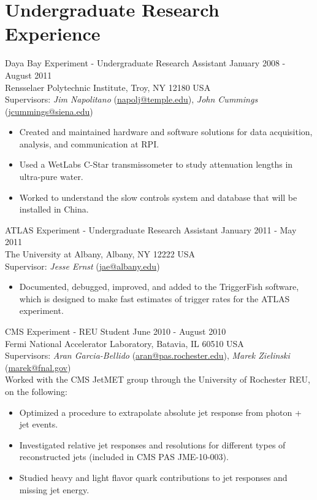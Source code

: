 \section{Undergraduate Research Experience}
Daya Bay Experiment - Undergraduate Research Assistant \hfill January 2008 - August 2011\\
Rensselaer Polytechnic Institute, Troy, NY 12180 USA\\
Supervisors: {\sl Jim Napolitano} (\href{mailto:napolj@temple.edu}{napolj@temple.edu}), {\sl John Cummings} (\href{mailto:jcummings@siena.edu}{jcummings@siena.edu})
\begin{itemize}[leftmargin=12pt]
\item Created and maintained hardware and software solutions for data acquisition, analysis, and communication at RPI.
\item Used a WetLabs C-Star transmissometer to study attenuation lengths in ultra-pure water.
\item Worked to understand the slow controls system and database that will be installed in China.
\end{itemize}
ATLAS Experiment - Undergraduate Research Assistant \hfill January 2011 - May 2011\\
The University at Albany, Albany, NY 12222 USA\\
Supervisor: {\sl Jesse Ernst} (\href{mailto:jae@albany.edu}{jae@albany.edu})
\begin{itemize}[leftmargin=12pt]
\item Documented, debugged, improved, and added to the TriggerFish software, which is designed to make fast estimates of trigger rates for the ATLAS experiment.
\end{itemize}
CMS Experiment - REU Student \hfill June 2010 - August 2010\\
Fermi National Accelerator Laboratory, Batavia, IL 60510 USA\\
Supervisors: {\sl Aran Garcia-Bellido} (\href{mailto:aran@pas.rochester.edu}{aran@pas.rochester.edu}), {\sl Marek Zielinski} (\href{mailto:marek@fnal.gov}{marek@fnal.gov})\\
Worked with the CMS JetMET group through the University of Rochester REU, on the following:
\begin{itemize}[leftmargin=12pt]
\item Optimized a procedure to extrapolate absolute jet response from photon + jet events.
\item Investigated relative jet responses and resolutions for different types of reconstructed jets (included in CMS PAS JME-10-003).
\item Studied heavy and light flavor quark contributions to jet responses and missing jet energy.
\end{itemize}
